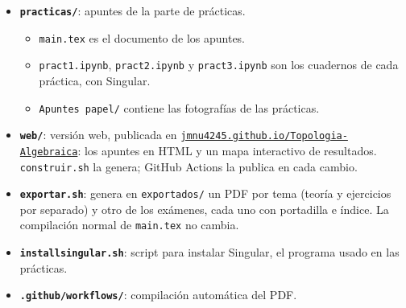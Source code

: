 \begin{itemize}
\begin{itemize}
        \item \texttt{generar.py} es el script que lo genera.
    \end{itemize}
    \item \textbf{\texttt{practicas/}}: apuntes de la parte de prácticas.
    \begin{itemize}
        \item \texttt{main.tex} es el documento de los apuntes.
        \item \texttt{pract1.ipynb}, \texttt{pract2.ipynb} y \texttt{pract3.ipynb} son los cuadernos de cada práctica, con Singular.
        \item \texttt{Apuntes papel/} contiene las fotografías de las prácticas.
    \end{itemize}
    \item \textbf{\texttt{web/}}: versión web, publicada en \href{https://jmnu4245.github.io/Topologia-Algebraica/}{\texttt{jmnu4245.github.io/Topologia-Algebraica}}: los apuntes en HTML y un mapa interactivo de resultados. \texttt{construir.sh} la genera; GitHub Actions la publica en cada cambio.
    \item \textbf{\texttt{exportar.sh}}: genera en \texttt{exportados/} un PDF por tema (teoría y ejercicios por separado) y otro de los exámenes, cada uno con portadilla e índice. La compilación normal de \texttt{main.tex} no cambia.
    \item \textbf{\texttt{installsingular.sh}}: script para instalar Singular, el programa usado en las prácticas.
    \item \textbf{\texttt{.github/workflows/}}: compilación automática del PDF.
\end{itemize}

